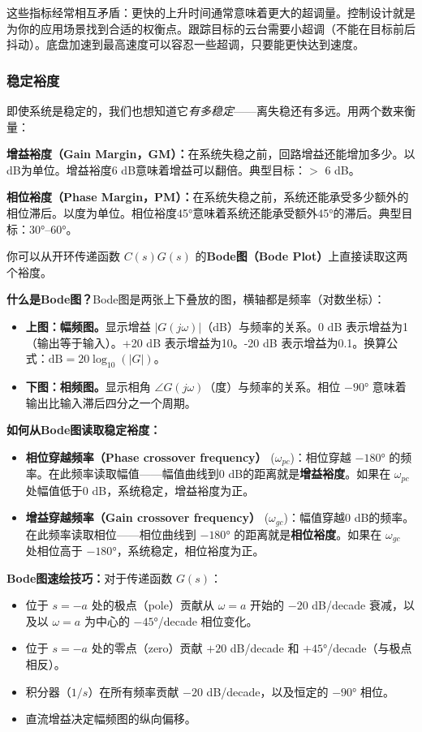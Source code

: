 这些指标经常相互矛盾：更快的上升时间通常意味着更大的超调量。控制设计就是为你的应用场景找到合适的权衡点。跟踪目标的云台需要小超调（不能在目标前后抖动）。底盘加速到最高速度可以容忍一些超调，只要能更快达到速度。

\subsubsection{稳定裕度}

即使系统是稳定的，我们也想知道它\textit{有多稳定}——离失稳还有多远。用两个数来衡量：

\textbf{增益裕度（Gain Margin，GM）：}在系统失稳之前，回路增益还能增加多少。以dB为单位。增益裕度6 dB意味着增益可以翻倍。典型目标：$>$ 6 dB。

\textbf{相位裕度（Phase Margin，PM）：}在系统失稳之前，系统还能承受多少额外的相位滞后。以度为单位。相位裕度45°意味着系统还能承受额外45°的滞后。典型目标：30°--60°。

你可以从开环传递函数 $C(s)G(s)$ 的\textbf{Bode图（Bode Plot）}上直接读取这两个裕度。

\textbf{什么是Bode图？}Bode图是两张上下叠放的图，横轴都是频率（对数坐标）：
\begin{itemize}
    \item \textbf{上图：幅频图。}显示增益 $|G(j\omega)|$（dB）与频率的关系。0 dB 表示增益为1（输出等于输入）。+20 dB 表示增益为10。-20 dB 表示增益为0.1。换算公式：$\text{dB} = 20 \log_{10}(|G|)$。
    \item \textbf{下图：相频图。}显示相角 $\angle G(j\omega)$（度）与频率的关系。相位 $-90°$ 意味着输出比输入滞后四分之一个周期。
\end{itemize}

\textbf{如何从Bode图读取稳定裕度：}
\begin{itemize}
    \item \textbf{相位穿越频率（Phase crossover frequency）} ($\omega_{pc}$)：相位穿越 $-180°$ 的频率。在此频率读取幅值——幅值曲线到0 dB的距离就是\textbf{增益裕度}。如果在 $\omega_{pc}$ 处幅值低于0 dB，系统稳定，增益裕度为正。
    \item \textbf{增益穿越频率（Gain crossover frequency）} ($\omega_{gc}$)：幅值穿越0 dB的频率。在此频率读取相位——相位曲线到 $-180°$ 的距离就是\textbf{相位裕度}。如果在 $\omega_{gc}$ 处相位高于 $-180°$，系统稳定，相位裕度为正。
\end{itemize}

\textbf{Bode图速绘技巧：}对于传递函数 $G(s)$：
\begin{itemize}
    \item 位于 $s = -a$ 处的极点（pole）贡献从 $\omega = a$ 开始的 $-20$ dB/decade 衰减，以及以 $\omega = a$ 为中心的 $-45°$/decade 相位变化。
    \item 位于 $s = -a$ 处的零点（zero）贡献 $+20$ dB/decade 和 $+45°$/decade（与极点相反）。
    \item 积分器（$1/s$）在所有频率贡献 $-20$ dB/decade，以及恒定的 $-90°$ 相位。
    \item 直流增益决定幅频图的纵向偏移。
\end{itemize}

